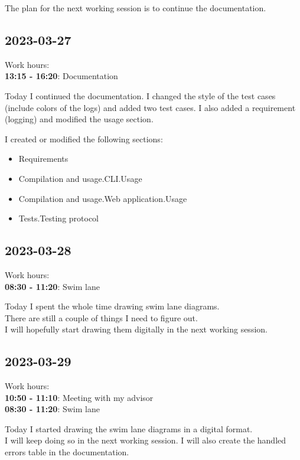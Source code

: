 \documentclass{article}
\begin{document}
The plan for the next working session is to continue the documentation.

\subsection{2023-03-27}

Work hours:\\
\textbf{13:15 - 16:20}: Documentation

Today I continued the documentation.
I changed the style of the test cases (include colors of the logs)
and added two test cases. I also added a requirement (logging)
and modified the usage section.

I created or modified the following sections:
\begin{itemize}
    \item Requirements
    \item Compilation and usage.CLI.Usage
    \item Compilation and usage.Web application.Usage
    \item Tests.Testing protocol
\end{itemize}

\subsection{2023-03-28}

Work hours:\\
\textbf{08:30 - 11:20}: Swim lane

Today I spent the whole time drawing swim lane diagrams. \\
There are still a couple of things I need to figure out. \\
I will hopefully start drawing them digitally in the next
working session.

\subsection{2023-03-29}

Work hours:\\
\textbf{10:50 - 11:10}: Meeting with my advisor \\
\textbf{08:30 - 11:20}: Swim lane

Today I started drawing the swim lane diagrams in a digital format. \\
I will keep doing so in the next working session.
I will also create the handled errors table in the documentation.
\end{document}

